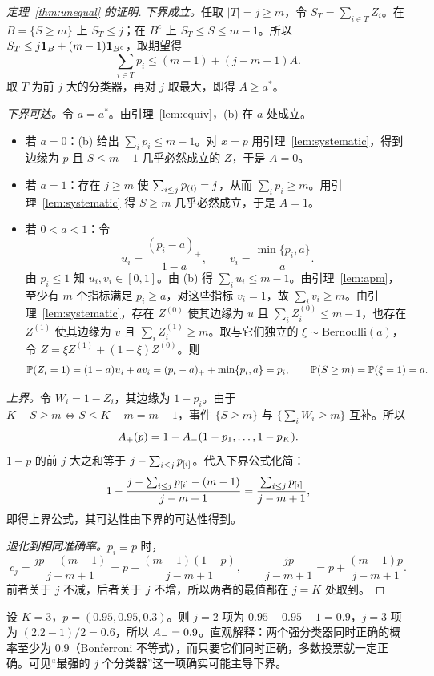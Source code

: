 \documentclass[11pt]{article}
\begin{document}
\begin{proof}[定理~\ref{thm:unequal} 的证明]
\emph{下界成立。}任取 $|T|=j\ge m$，令 $S_T=\sum_{i\in T}Z_i$。在 $B=\{S\ge m\}$ 上 $S_T\le j$；在 $B^c$ 上 $S_T\le S\le m-1$。所以 $S_T\le j\mathbf{1}_B+(m-1)\mathbf{1}_{B^c}$，取期望得
\[
\sum_{i\in T}p_i\le(m-1)+(j-m+1)A .
\]
取 $T$ 为前 $j$ 大的分类器，再对 $j$ 取最大，即得 $A\ge a^\ast$。

\emph{下界可达。}令 $a=a^\ast$。由引理~\ref{lem:equiv}，(b) 在 $a$ 处成立。
\begin{itemize}
\item 若 $a=0$：(b) 给出 $\sum_ip_i\le m-1$。对 $x=p$ 用引理~\ref{lem:systematic}，得到边缘为 $p$ 且 $S\le m-1$ 几乎必然成立的 $Z$，于是 $A=0$。
\item 若 $a=1$：存在 $j\ge m$ 使 $\sum_{i\le j}p_{(i)}=j$，从而 $\sum_ip_i\ge m$。用引理~\ref{lem:systematic} 得 $S\ge m$ 几乎必然成立，于是 $A=1$。
\item 若 $0<a<1$：令
\[
u_i=\frac{(p_i-a)_+}{1-a},\qquad v_i=\frac{\min\{p_i,a\}}{a}.
\]
由 $p_i\le1$ 知 $u_i,v_i\in[0,1]$。由 (b) 得 $\sum_iu_i\le m-1$。由引理~\ref{lem:apm}，至少有 $m$ 个指标满足 $p_i\ge a$，对这些指标 $v_i=1$，故 $\sum_iv_i\ge m$。由引理~\ref{lem:systematic}，存在 $Z^{(0)}$ 使其边缘为 $u$ 且 $\sum_iZ^{(0)}_i\le m-1$，也存在 $Z^{(1)}$ 使其边缘为 $v$ 且 $\sum_iZ^{(1)}_i\ge m$。取与它们独立的 $\xi\sim\mathrm{Bernoulli}(a)$，令 $Z=\xi Z^{(1)}+(1-\xi)Z^{(0)}$。则
\[
\mathbb{P}(Z_i=1)=(1-a)u_i+a v_i=(p_i-a)_++\min\{p_i,a\}=p_i,\qquad \mathbb{P}(S\ge m)=\mathbb{P}(\xi=1)=a .
\]
\end{itemize}

\emph{上界。}令 $W_i=1-Z_i$，其边缘为 $1-p_i$。由于 $K-S\ge m\iff S\le K-m=m-1$，事件 $\{S\ge m\}$ 与 $\{\sum_iW_i\ge m\}$ 互补。所以
\[
A_{+}(p)=1-A_{-}(1-p_1,\dots,1-p_K).
\]
$1-p$ 的前 $j$ 大之和等于 $j-\sum_{i\le j}p_{[i]}$。代入下界公式化简：
\[
1-\frac{j-\sum_{i\le j}p_{[i]}-(m-1)}{j-m+1}=\frac{\sum_{i\le j}p_{[i]}}{j-m+1},
\]
即得上界公式，其可达性由下界的可达性得到。

\emph{退化到相同准确率。}$p_i\equiv p$ 时，
\[
c_j=\frac{jp-(m-1)}{j-m+1}=p-\frac{(m-1)(1-p)}{j-m+1},\qquad \frac{jp}{j-m+1}=p+\frac{(m-1)p}{j-m+1}.
\]
前者关于 $j$ 不减，后者关于 $j$ 不增，所以两者的最值都在 $j=K$ 处取到。
\end{proof}

\begin{example}
设 $K=3$，$p=(0.95,0.95,0.3)$。则 $j=2$ 项为 $0.95+0.95-1=0.9$，$j=3$ 项为 $(2.2-1)/2=0.6$，所以 $A_{-}=0.9$。直观解释：两个强分类器同时正确的概率至少为 $0.9$（Bonferroni 不等式），而只要它们同时正确，多数投票就一定正确。可见“最强的 $j$ 个分类器”这一项确实可能主导下界。
\end{example}
\end{document}
